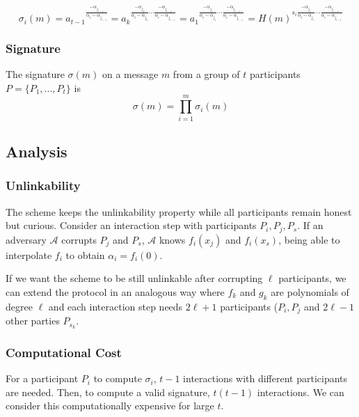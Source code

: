 $$
\sigma_i (m)
= a_{t-1} {}^{\frac{- \alpha_{j_{t-1}}}{\alpha_{i} - \alpha_{j_{t-1}}}}
= a_k {}^{\frac{- \alpha_{j_{k}}}{\alpha_{i} - \alpha_{j_{k}}} \cdots \frac{- \alpha_{j_{t-1}}}{\alpha_{i} - \alpha_{j_{t-1}}}}
= a_1 {}^{\frac{- \alpha_{j_{1}}}{\alpha_{i} - \alpha_{j_{1}}} \cdots \frac{- \alpha_{j_{t-1}}}{\alpha_{i} - \alpha_{j_{t-1}}}}
= H(m)^{ s_i \frac{- \alpha_{j_{1}}}{\alpha_{i} - \alpha_{j_{1}}} \cdots \frac{- \alpha_{j_{t-1}}}{\alpha_{i} - \alpha_{j_{t-1}}}}
$$

\subsubsection*{Signature}
The signature $\sigma(m)$ on a message $m$ from a group of $t$ participants $P = \{P_1, ... , P_t \}$ is
$$\sigma(m) = \prod_{i=1}^m \sigma_i(m)$$

\subsection{Analysis}
\subsubsection*{Unlinkability}
The scheme keeps the unlinkability property while all participants remain honest but curious. Consider an interaction step with participants $P_i,P_j,P_s$. If an adversary $\mathcal{A}$ corrupts $P_j$ and $P_s$, $\mathcal{A}$ knows $f_i(x_j)$ and $f_i(x_s)$, being able to interpolate $f_i$ to obtain $\alpha_i = f_i(0)$.

If we want the scheme to be still unlinkable after corrupting $\ell$ participants, we can extend the protocol in an analogous way where $f_k$ and $g_k$ are polynomials of degree $\ell$ and each interaction step needs $2 \ell + 1$ participants ($P_i,P_j$ and $2 \ell - 1$ other parties $P_{s_k}$.

\subsubsection*{Computational Cost}
For a participant $P_i$ to compute $\sigma_i$, $t-1$ interactions with different participants are needed. Then, to compute a valid signature, $t(t-1)$ interactions. We can consider this computationally expensive for large $t$.
